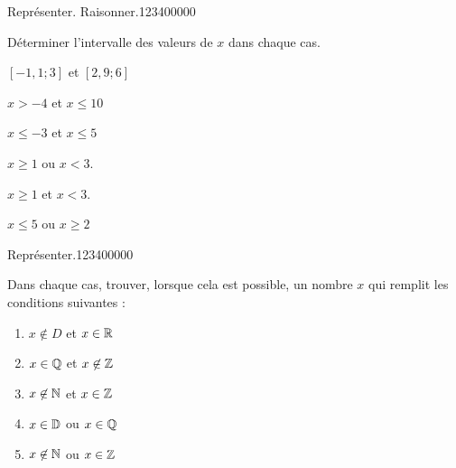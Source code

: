 
\begin{pageParcoursd} %

\begin{ExoCd}{Représenter. Raisonner.}{1234}{0}{0}{0}{0}{0}

Déterminer l'intervalle des valeurs de $x$ dans chaque cas.

\begin{enumerate}
\begin{minipage}{0.5\linewidth}
% 

\item $[-1,1;3]$ et $[2,9;6]$
\item $x > -4$ et $x \leq 10$
\item $x \leq -3$ et $x \leq 5$


\end{minipage}
\begin{minipage}{0.5\linewidth}
% 
\item $x \geq 1$ ou $x<3$.  
\item $x \geq 1$ et $x<3$.  
\item $x \leq 5$ ou $x \geq 2$
\end{minipage}
\end{enumerate}

\end{ExoCd}

\begin{ExoCd}{Représenter.}{1234}{0}{0}{0}{0}{0}

Dans chaque cas, trouver, lorsque cela est possible, un nombre $x$ qui remplit les conditions suivantes :
 
\begin{enumerate}[leftmargin=*]
\item $x \not\in D$ et $x \in \mathbb R$  
\item $x \in \mathbb Q$ et $x \not\in \mathbb Z$  
\item $x \not\in \mathbb N$ et $x \in \mathbb Z$  
\item $x \in \mathbb D$ ou $x \in \mathbb Q$  
\item $x \not\in \mathbb N$ ou $x \in \mathbb Z$  
\end{enumerate}
 
 \end{ExoCd}


\end{pageParcoursd}
